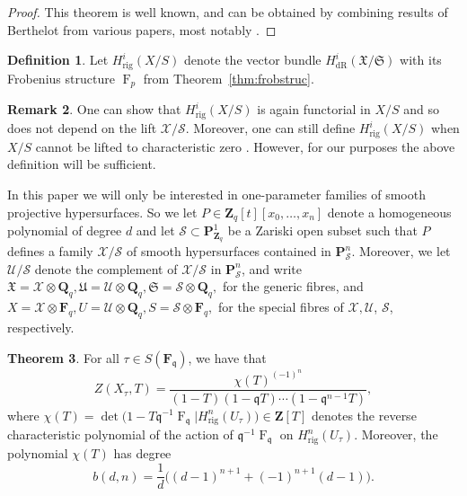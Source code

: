 \documentclass[a4paper,11pt]{article}
\numberwithin{equation}{section}
\newcommand{\ZZ}{\mathbf{Z}} %
\newcommand{\QQ}{\mathbf{Q}} %
\newcommand{\FF}{\mathbf{F}} %
\DeclareMathOperator{\Frob}{F}           %
\providecommand{\HdR}{H_{\text{dR}}}    %
\providecommand{\Hrig}{H_{\text{rig}}}  %
\theoremstyle{definition}
\newtheorem{thm}{Theorem}[section]
\newtheorem{defn}[thm]{Definition}
\newtheorem{rem}[thm]{Remark}
\begin{document}
\begin{proof}
This theorem is well known, and can be obtained by combining results of 
Berthelot from various papers, most notably \cite{Berthelot1986}.   
\end{proof}

\begin{defn}
Let $\Hrig^i(X/S)$ denote the vector bundle $\HdR^i(\mathfrak{X}/\mathfrak{S})$ with its Frobenius
structure $\Frob_p$ from Theorem~\ref{thm:frobstruc}.
\end{defn}

\begin{rem}
One can show that $\Hrig^i(X/S)$ is again functorial in $X/S$ and so does not depend on the lift $\mathcal{X}/\mathcal{S}$. 
Moreover, one can still define $\Hrig^i(X/S)$ when $X/S$ cannot be lifted to characteristic zero \cite{Berthelot1986}.
However, for our purposes the above definition will be sufficient.
\end{rem}

In this paper we will only be interested in one-parameter families of smooth projective hypersurfaces. 
So we let $P \in \ZZ_q[t][x_0,\ldots,x_n]$ denote a homogeneous polynomial of degree $d$ and let 
$\mathcal{S} \subset \mathbf{P}^1_{\ZZ_q}$ be a Zariski open subset such that $P$ defines a family  
$\mathcal{X}/\mathcal{S}$ of smooth hypersurfaces contained in $\mathbf{P}^n_{\mathcal{S}}$. Moreover, we let
$\mathcal{U}/\mathcal{S}$ denote the complement of $\mathcal{X}/\mathcal{S}$ in $\mathbf{P}^n_{\mathcal{S}}$,
and write 
$\mathfrak{X}=\mathcal{X} \otimes \QQ_q, \mathfrak{U}=\mathcal{U} \otimes \QQ_q, \mathfrak{S}=\mathcal{S} \otimes \QQ_q,$
for the generic fibres, and
$X=\mathcal{X} \otimes \FF_q, U=\mathcal{U} \otimes \QQ_q, S=\mathcal{S} \otimes \FF_q,$
for the special fibres of $\mathcal{X},\mathcal{U}$, $\mathcal{S}$, respectively.

\begin{thm} \label{thm:hypersurface} For all $\tau \in S(\FF_{\mathfrak{q}})$, we have that
\begin{equation} \label{eq:formulazeta}
Z(X_{\tau},T) = \frac{\chi(T)^{(-1)^n}}{(1 - T) (1 - \mathfrak{q}T) \dotsm (1 - \mathfrak{q}^{n-1}T)},
\end{equation}
where 
$\chi(T) = \det \bigl( 1 - T \mathfrak{q}^{-1} \Frob_{\mathfrak{q}} | \Hrig^n(U_{\tau}) \bigr) \in \ZZ[T]$
denotes the reverse characteristic polynomial of the action of $\mathfrak{q}^{-1} \Frob_{\mathfrak{q}}$ 
on $\Hrig^n(U_{\tau})$. Moreover, the polynomial $\chi(T)$ has degree 
\begin{equation} \label{eq:formulab}
b(d,n)=\frac{1}{d} \bigl((d-1)^{n+1} + (-1)^{n+1}(d-1) \bigr).
\end{equation}
\end{thm}
\end{document}
